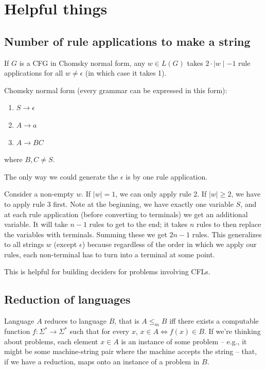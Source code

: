 \documentclass[11pt]{article}
\begin{document}
\newpage
\section{Helpful things}
\subsection{Number of rule applications to make a string}
If $G$ is a CFG in Chomsky normal form, any $w \in L(G)$ takes $2 \cdot \mid w \mid - 1$ rule applications for all $w \neq \epsilon$ (in which case it takes 1).

Chomsky normal form (every grammar can be expressed in this form):
\begin{enumerate}
	\item $S \to \epsilon$
	\item $A \to a$
	\item $A \to BC$
\end{enumerate}
where $B, C \neq S$.

The only way we could generate the $\epsilon$ is by one rule application.

Consider a non-empty $w$. If $\mid w \mid = 1$, we can only apply rule 2. If $\mid w \mid \geq 2$, we have to apply rule 3 first. Note at the beginning, we have exactly one variable $S$, and at each rule application (before converting to terminals) we get an additional variable. It will take $n - 1$ rules to get to the end; it takes $n$ rules to then replace the variables with terminals. Summing these we get $2n - 1$ rules. This generalizes to all strings $w$ (except $\epsilon$) because regardless of the order in which we apply our rules, each non-terminal has to turn into a terminal at some point.

This is helpful for building deciders for problems involving CFLs.

\subsection{Reduction of languages}
Language $A$ reduces to language $B$, that is $A \leq_m B$ iff there exists a computable function $f \colon \Sigma^* \to \Sigma^* $ such that for every $x$, $x \in A \iff f(x) \in B$. If we're thinking about problems, each element $x \in A$ is an instance of some problem -- e.g., it might be some machine-string pair where the machine accepts the string -- that, if we have a reduction, maps onto an instance of a problem in $B$. 
\end{document}

